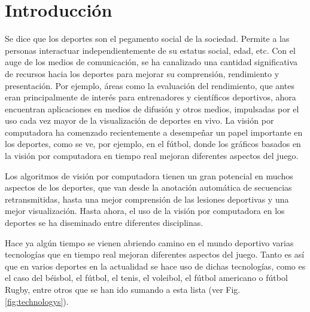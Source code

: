 \chapter*{Introducción}\label{chapter:introduction}

Se dice que los deportes son el pegamento social de la sociedad. Permite a las personas interactuar independientemente de su estatus social, edad, etc. Con el auge de los medios de comunicación, se ha canalizado una cantidad significativa de recursos hacia los deportes para mejorar su comprensión, rendimiento y presentación. Por ejemplo, áreas como la evaluación del rendimiento, que antes eran principalmente de interés para entrenadores y científicos deportivos, ahora encuentran aplicaciones en medios de difusión y otros medios, impulsadas por el uso cada vez mayor de la visualización de deportes en vivo. La visión por computadora ha comenzado recientemente a desempeñar un papel importante en los deportes, como se ve, por ejemplo, en el fútbol, donde los gráficos basados en la visión por computadora en tiempo real mejoran diferentes aspectos del juego.

Los algoritmos de visión por computadora tienen un gran potencial en muchos aspectos de los deportes, que van desde la anotación automática de secuencias retransmitidas, hasta una mejor comprensión de las lesiones deportivas y una mejor visualización. Hasta ahora, el uso de la visión por computadora en los deportes se ha diseminado entre diferentes disciplinas.

Hace ya algún tiempo se vienen abriendo camino en el mundo deportivo varias tecnologías que en tiempo real mejoran diferentes aspectos del juego. Tanto es así que en varios deportes en la actualidad se hace uso de dichas tecnologías, como es el caso del béisbol, el fútbol, el tenis, el voleibol, el fútbol americano o fútbol Rugby, entre otros que se han ido sumando a esta lista (ver Fig. \ref{fig:technologys}).

